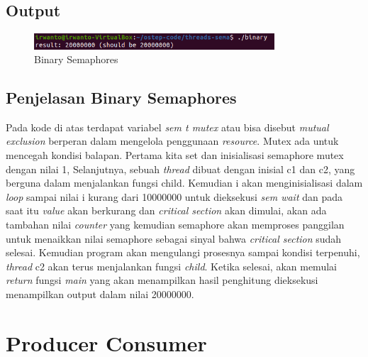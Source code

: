 \documentclass[11pt,a4paper]{article}
\begin{document}
\subsection{Output}
\begin{figure}[h]
    \centering
    \includegraphics[width=0.8\textwidth]{Figure/binary1.png}
    \caption{Binary Semaphores}
    \label{fig:my_label}
\end{figure}

\subsection{Penjelasan Binary Semaphores}
Pada kode di atas terdapat variabel \textit{sem t mutex} atau bisa disebut \textit{mutual exclusion} berperan dalam mengelola penggunaan \textit{resource}. Mutex ada untuk mencegah kondisi balapan. Pertama kita set dan inisialisasi semaphore mutex dengan nilai 1, Selanjutnya, sebuah \textit{thread} dibuat dengan inisial c1 dan c2, yang berguna dalam menjalankan fungsi child. Kemudian i akan menginisialisasi dalam \textit{loop} sampai nilai i kurang dari 10000000 untuk dieksekusi \textit{sem wait} dan pada saat itu \textit{value} akan berkurang dan \textit{critical section} akan dimulai, akan ada tambahan nilai \textit{counter} yang kemudian semaphore akan memproses panggilan untuk menaikkan nilai semaphore sebagai sinyal bahwa \textit{critical section} sudah selesai. Kemudian program akan mengulangi prosesnya sampai kondisi terpenuhi, \textit{thread} c2 akan terus menjalankan fungsi \textit{child}. Ketika selesai, akan memulai \textit{return} fungsi \textit{main} yang akan menampilkan hasil penghitung dieksekusi menampilkan output dalam nilai 20000000.

\section{Producer Consumer}
\end{document}

